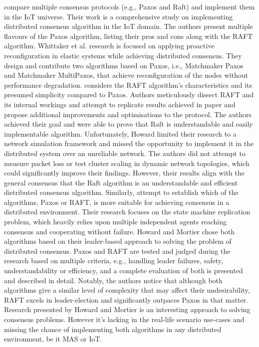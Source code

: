 \documentclass[oneside,12pt]{book}
\begin{document}
\cite{whittaker2020matchmaker} compare multiple consensus protocols (e.g., Paxos and Raft) and implement them in the IoT universe. Their work is a comprehensive study on implementing distributed consensus algorithm in the IoT domain. The authors present multiple flavours of the Paxos algorithm, listing their pros and cons along with the RAFT algorithm. Whittaker et al. research is focused on applying proactive reconfiguration in elastic systems while achieving distributed consensus. They design and contribute two algorithms based on Paxos, i.e., Matchmaker Paxos and Matchmaker MultiPaxos, that achieve reconfiguration of the nodes without performance degradation.\smallskip \newline
\cite{UCAM-CL-TR-857} considers the RAFT algorithm’s characteristics and its presumed simplicity compared to Paxos. Authors meticulously dissect RAFT and its internal workings and attempt to replicate results achieved in \cite{10.5555/2643634.2643666} paper and propose additional improvements and optimisations to the protocol. The authors achieved their goal and were able to prove that Raft is understandable and easily implementable algorithm. Unfortunately, Howard limited their research to a network simulation framework and missed the opportunity to implement it in the distributed system over an unreliable network. The authors did not attempt to measure packet loss or test cluster scaling in dynamic network topologies, which could significantly improve their findings. However, their results align with the general consensus that the Raft algorithm is an understandable and efficient distributed consensus algorithm.\smallskip \newline
Similarly, \cite{10.1145/3380787.3393681} attempt to establish which of the algorithms, Paxos or RAFT, is more suitable for achieving consensus in a distributed environment. Their research focuses on the state machine replication problem, which heavily relies upon multiple independent agents reaching consensus and cooperating without failure. Howard and Mortier chose both algorithms based on their leader-based approach to solving the problem of distributed consensus. Paxos and RAFT are tested and judged during the research based on multiple criteria, e.g., handling leader failures, safety, understandability or efficiency, and a complete evaluation of both is presented and described in detail. Notably, the authors notice that although both algorithms give a similar level of complexity that may affect their undesirability, RAFT excels in leader-election and significantly outpaces Paxos in that matter. Research presented by Howard and Mortier is an interesting approach to solving consensus problems. However it’s lacking in the real-life scenario use-cases and missing the chance of implementing both algorithms in any distributed environment, be it MAS or IoT.
\end{document}
